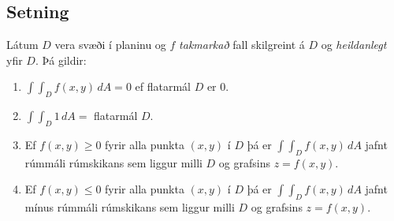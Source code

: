 \documentclass[a4paper,10pt,icelandic]{sphinxmanual}
\begin{document}
\subsection{Setning}
\label{Kafli4:id4}
Látum \(D\) vera svæði í planinu og \(f\) \textit{takmarkað} fall
skilgreint á \(D\) og \textit{heildanlegt} yfir \(D\). Þá gildir:
\begin{enumerate}
\item {} 
\(\int\!\!\!\int_D f(x,y)\,dA=0\) ef flatarmál \(D\) er 0.

\item {} 
\(\int\!\!\!\int_D 1\,dA=\) flatarmál \(D\).

\item {} 
Ef \(f(x,y)\geq 0\) fyrir alla punkta \((x,y)\) í \(D\)
þá er \(\int\!\!\!\int_D f(x,y)\,dA\) jafnt rúmmáli rúmskikans
sem liggur milli \(D\) og grafsins \(z=f(x,y)\).

\item {} 
Ef \(f(x,y)\leq 0\) fyrir alla punkta \((x,y)\) í \(D\)
þá er \(\int\!\!\!\int_D f(x,y)\,dA\) jafnt mínus rúmmáli
rúmskikans sem liggur milli \(D\) og grafsins \(z=f(x,y)\).

\end{enumerate}
\end{document}
